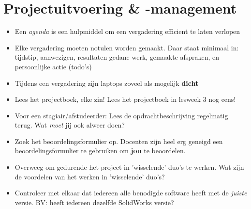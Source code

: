 \documentclass[24pt,a4paper]{article}
\begin{document}
\section{Projectuitvoering \& -management}
\begin{itemize}
      \mssep

      \item Een \textit{agenda} is een hulpmiddel om een vergadering efficient te laten verlopen
      \item Elke vergadering moeten notulen worden gemaakt. Daar staat minimaal in: tijdstip, aanwezigen, resultaten gedane werk, gemaakte afspraken, en persoonlijke actie (todo's)
      \item Tijdens een vergadering zijn laptops zoveel als mogelijk \textbf{dicht}
      \item Lees het projectboek, elke zin! Lees het projectboek in lesweek 3 nog eens!
      \item Voor een stagiair/afstudeerder: Lees de opdrachtbeschrijving regelmatig terug. Wat \textit{moet} jij ook alweer doen?
      \item Zoek het beoordelingsformulier op.
            Docenten zijn heel erg geneigd een beoordelingsformulier te gebruiken om \textbf{jou} te beoordelen.
      \item Overweeg om gedurende het project in 'wisselende' duo's te werken.
            Wat zijn de voordelen van het werken in 'wisselende' duo's?
      \item Controleer met elkaar dat iedereen alle benodigde software heeft met de \textit{juiste} versie. BV: heeft iedereen dezelfde SolidWorks versie?

\end{itemize}
\end{document}
